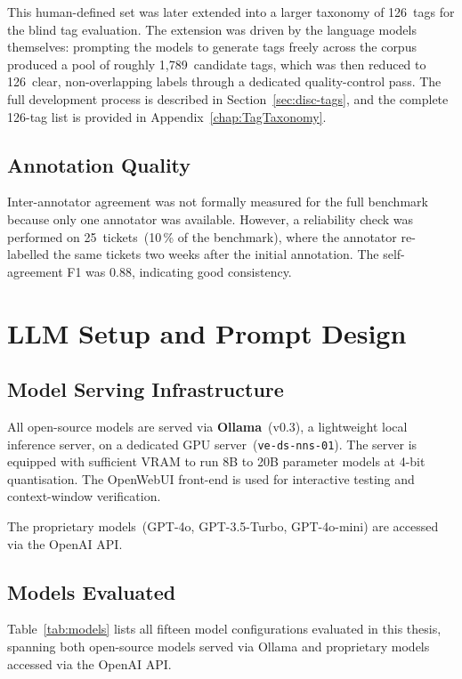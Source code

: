 This human-defined set was later extended into a larger taxonomy of
126~tags for the blind tag evaluation.  The extension was driven by the
language models themselves: prompting the models to generate tags freely across
the corpus produced a pool of roughly 1{,}789~candidate tags, which was then
reduced to 126~clear, non-overlapping labels through a dedicated
quality-control pass.  The full development process is described in
Section~\ref{sec:disc-tags}, and the complete 126-tag list is provided in
Appendix~\ref{chap:TagTaxonomy}.

\subsection{Annotation Quality}
%
Inter-annotator agreement was not formally measured for the full benchmark
because only one annotator was available.  However, a reliability check was
performed on 25~tickets~(10\,\% of the benchmark), where the annotator
re-labelled the same tickets two weeks after the initial annotation.
The self-agreement F1 was \(0.88\), indicating good consistency.

\section{LLM Setup and Prompt Design}
\label{sec:llm-setup}
%
\subsection{Model Serving Infrastructure}
%
All open-source models are served via \textbf{Ollama}~(v0.3), a lightweight
local inference server, on a dedicated GPU server~(\texttt{ve-ds-nns-01}).
The server is equipped with sufficient VRAM to run 8B to 20B parameter models
at 4-bit quantisation.  The OpenWebUI front-end is used for interactive
testing and context-window verification.

The proprietary models~(GPT-4o, GPT-3.5-Turbo, GPT-4o-mini) are accessed via
the OpenAI API.

\subsection{Models Evaluated}
%
Table~\ref{tab:models} lists all fifteen model configurations evaluated in
this thesis, spanning both open-source models served via Ollama and
proprietary models accessed via the OpenAI API.

